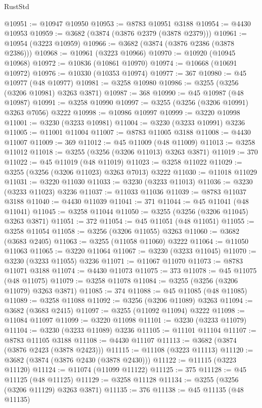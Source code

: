 \begin{lexlean}{RustStd}
\begin{coremodule}
@10951 := @10947 @10950
@10953 := @8783 @10951 @3188
@10954 := @4430 @10953
@10959 := @3682 (@3874 (@3876 @2379 (@3878 @2379)))
@10961 := @10954 (@3223 @10959)
@10966 := @3682 (@3874 (@3876 @2386 (@3878 @2386)))
@10968 := @10961 (@3223 @10966)
@10970 := @10920 (@10945 @10968)
@10972 := @10836 (@10861 @10970)
@10974 := @10668 (@10691 @10972)
@10976 := @10330 (@10353 @10974)
@10977 := 367
@10980 := @45 @10977 (@48 @10977)
@10981 := @3258 @10980
@10986 := @3255 (@3256 (@3206 @10981) @3263 @3871)
@10987 := 368
@10990 := @45 @10987 (@48 @10987)
@10991 := @3258 @10990
@10997 := @3255 (@3256 (@3206 @10991) @3263 @7056) @3222
@10998 := @10986 @10997
@10999 := @3220 @10998
@11001 := @3230 (@3233 @10981)
@11004 := @3230 (@3233 @10991) @3236
@11005 := @11001 @11004
@11007 := @8783 @11005 @3188
@11008 := @4430 @11007
@11009 := 369
@11012 := @45 @11009 (@48 @11009)
@11013 := @3258 @11012
@11018 := @3255 (@3256 (@3206 @11013) @3263 @3871)
@11019 := 370
@11022 := @45 @11019 (@48 @11019)
@11023 := @3258 @11022
@11029 := @3255 (@3256 (@3206 @11023) @3263 @7013) @3222
@11030 := @11018 @11029
@11031 := @3220 @11030
@11033 := @3230 (@3233 @11013)
@11036 := @3230 (@3233 @11023) @3236
@11037 := @11033 @11036
@11039 := @8783 @11037 @3188
@11040 := @4430 @11039
@11041 := 371
@11044 := @45 @11041 (@48 @11041)
@11045 := @3258 @11044
@11050 := @3255 (@3256 (@3206 @11045) @3263 @3871)
@11051 := 372
@11054 := @45 @11051 (@48 @11051)
@11055 := @3258 @11054
@11058 := @3256 (@3206 @11055) @3263
@11060 := @3682 (@3683 @2405)
@11063 := @3255 (@11058 @11060) @3222
@11064 := @11050 @11063
@11065 := @3220 @11064
@11067 := @3230 (@3233 @11045)
@11070 := @3230 (@3233 @11055) @3236
@11071 := @11067 @11070
@11073 := @8783 @11071 @3188
@11074 := @4430 @11073
@11075 := 373
@11078 := @45 @11075 (@48 @11075)
@11079 := @3258 @11078
@11084 := @3255 (@3256 (@3206 @11079) @3263 @3871)
@11085 := 374
@11088 := @45 @11085 (@48 @11085)
@11089 := @3258 @11088
@11092 := @3256 (@3206 @11089) @3263
@11094 := @3682 (@3683 @2415)
@11097 := @3255 (@11092 @11094) @3222
@11098 := @11084 @11097
@11099 := @3220 @11098
@11101 := @3230 (@3233 @11079)
@11104 := @3230 (@3233 @11089) @3236
@11105 := @11101 @11104
@11107 := @8783 @11105 @3188
@11108 := @4430 @11107
@11113 := @3682 (@3874 (@3876 @2423 (@3878 @2423)))
@11115 := @11108 (@3223 @11113)
@11120 := @3682 (@3874 (@3876 @2430 (@3878 @2430)))
@11122 := @11115 (@3223 @11120)
@11124 := @11074 (@11099 @11122)
@11125 := 375
@11128 := @45 @11125 (@48 @11125)
@11129 := @3258 @11128
@11134 := @3255 (@3256 (@3206 @11129) @3263 @3871)
@11135 := 376
@11138 := @45 @11135 (@48 @11135)

\end{coremodule}
\end{lexlean}
